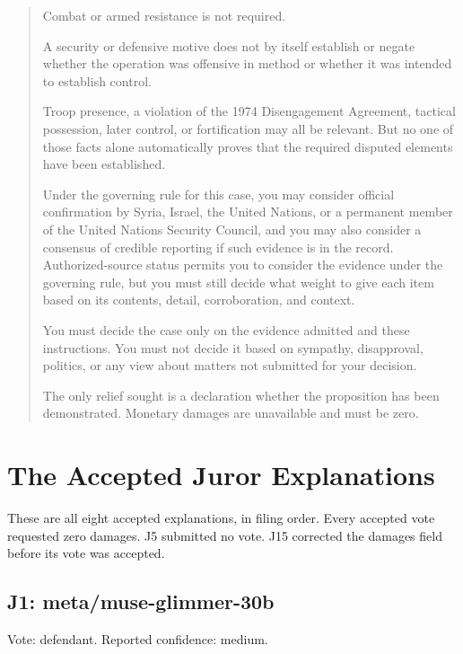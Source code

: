 \begin{quote}
Combat or armed resistance is not required.

A security or defensive motive does not by itself establish or negate whether the operation was offensive in method or whether it was intended to establish control.

Troop presence, a violation of the 1974 Disengagement Agreement, tactical possession, later control, or fortification may all be relevant. But no one of those facts alone automatically proves that the required disputed elements have been established.

Under the governing rule for this case, you may consider official confirmation by Syria, Israel, the United Nations, or a permanent member of the United Nations Security Council, and you may also consider a consensus of credible reporting if such evidence is in the record. Authorized-source status permits you to consider the evidence under the governing rule, but you must still decide what weight to give each item based on its contents, detail, corroboration, and context.

You must decide the case only on the evidence admitted and these instructions. You must not decide it based on sympathy, disapproval, politics, or any view about matters not submitted for your decision.

The only relief sought is a declaration whether the proposition has been demonstrated. Monetary damages are unavailable and must be zero.
\end{quote}

\section{The Accepted Juror Explanations}
These are all eight accepted explanations, in filing order.  Every accepted vote requested zero damages.  J5 submitted no vote.  J15 corrected the damages field before its vote was accepted.

\subsection{J1: meta/muse-glimmer-30b}

Vote: defendant.  Reported confidence: medium.

